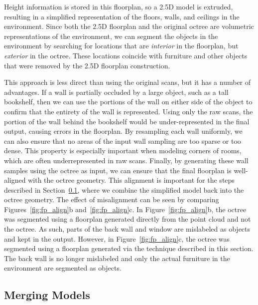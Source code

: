 \documentclass[review]{acmsiggraph}
\begin{document}
Height information is stored in this floorplan, so a 2.5D model is extruded, resulting in a simplified representation of the floors, walls, and ceilings in the environment.  Since both the 2.5D floorplan and the original octree are volumetric representations of the environment, we can segment the objects in the environment by searching for locations that are {\it interior} in the floorplan, but {\it exterior} in the octree.  These locations coincide with furniture and other objects that were removed by the 2.5D floorplan construction.

This approach is less direct than using the original scans, but it has a number of advantages.  If a wall is partially occluded by a large object, such as a tall bookshelf, then we can use the portions of the wall on either side of the object to confirm that the entirety of the wall is represented.  Using only the raw scans, the portion of the wall behind the bookshelf would be under-represented in the final output, causing errors in the floorplan.  By resampling each wall uniformly, we can also ensure that no areas of the input wall sampling are too sparse or too dense.  This property is especially important when modeling corners of rooms, which are often underrepresented in raw scans.  Finally, by generating these wall samples using the octree as input, we can ensure that the final floorplan is well-aligned with the octree geometry.  This alignment is important for the steps described in Section~\ref{ssec:merge}, where we combine the simplified model back into the octree geometry.  The effect of misalignment can be seen by comparing Figures~\ref{fig:fp_align}b and~\ref{fig:fp_align}c.  In Figure~\ref{fig:fp_align}b, the octree was segmented using a floorplan generated directly from the point cloud and not the octree.  As such, parts of the back wall and window are mislabeled as objects and kept in the output.  However, in Figure~\ref{fig:fp_align}c, the octree was segmented using a floorplan generated via the technique described in this section.  The back wall is no longer mislabeled and only the actual furniture in the environment are segmented as objects.



\subsection{Merging Models}
\label{ssec:merge}
\end{document}
